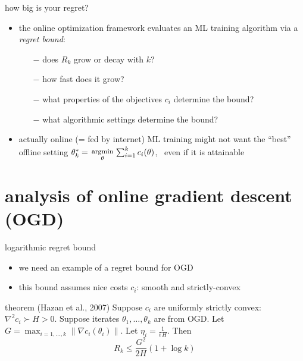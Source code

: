 \documentclass[xcolor={svgnames},
               hyperref={colorlinks,citecolor=DeepPink4,linkcolor=FireBrick,urlcolor=Maroon}]
               {beamer}
\newcommand{\grad}{\nabla}
\newcommand{\ds}{\displaystyle}
\begin{document}
\begin{frame}{how big is your regret?}

\begin{itemize}
\item the online optimization framework evaluates an ML training algorithm via a \emph{regret bound}:
    \begin{itemize}
    \item[$-$] does $R_k$ grow or decay with $k$?
    \item[$-$] how fast does it grow?
    \item[$-$] what properties of the objectives $c_i$ determine the bound?
    \item[$-$] what algorithmic settings determine the bound?
    \end{itemize}
\item actually online (= fed by internet) ML training might not want the ``best'' offline setting \quad $\theta_k^* = \begin{smallmatrix} \phantom{x} \\ \text{\footnotesize argmin} \\ \theta \end{smallmatrix} \sum_{i=1}^k c_i(\theta)$, \, even if it is attainable
\end{itemize}
\end{frame}


\section{analysis of online gradient descent (OGD)}

\begin{frame}{logarithmic regret bound}

\begin{itemize}
\item we need an example of a regret bound for OGD
\item this bound assumes nice costs $c_i$: smooth and strictly-convex
\end{itemize}

\begin{block}{theorem (Hazan et al., 2007)}
Suppose $c_i$ are uniformly strictly convex: $\grad^2 c_i \succ H > 0$.  Suppose iterates $\theta_1,\dots,\theta_k$ are from OGD.  Let $G = \max_{i=1,\dots,k} \|\grad c_i(\theta_i)\|$.  Let $\ds \eta_i = \frac{1}{i\,H}$.  Then
    $$R_k \le \frac{G^2}{2 H} (1 + \log k)$$
\end{block}
\end{frame}
\end{document}
